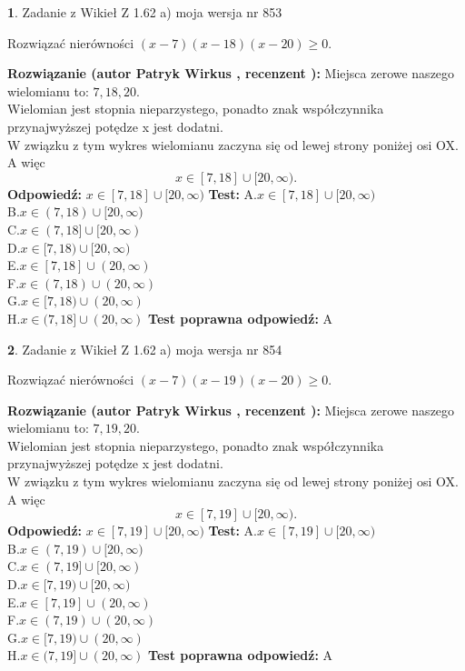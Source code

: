 \documentclass[12pt, a4paper]{article}
\theoremstyle{definition} %
\newtheorem{zad}{}
\newcommand{\zadStart}[1]{\begin{zad}#1\newline}
\newcommand{\zadStop}{\end{zad}}
\newcommand{\rozwStart}[2]{\noindent \textbf{Rozwiązanie (autor #1 , recenzent #2): }\newline}
\newcommand{\rozwStop}{\newline}
\newcommand{\odpStart}{\noindent \textbf{Odpowiedź:}\newline}
\newcommand{\odpStop}{\newline}
\newcommand{\testStart}{\noindent \textbf{Test:}\newline}
\newcommand{\testStop}{\newline}
\newcommand{\kluczStart}{\noindent \textbf{Test poprawna odpowiedź:}\newline}
\newcommand{\kluczStop}{\newline}
\begin{document}
\zadStart{Zadanie z Wikieł Z 1.62 a) moja wersja nr 853}

Rozwiązać nierówności $(x-7)(x-18)(x-20)\ge0$.
\zadStop
\rozwStart{Patryk Wirkus}{}
Miejsca zerowe naszego wielomianu to: $7, 18, 20$.\\
Wielomian jest stopnia nieparzystego, ponadto znak współczynnika przy\linebreak najwyższej potędze x jest dodatni.\\ W związku z tym wykres wielomianu zaczyna się od lewej strony poniżej osi OX. A więc $$x \in [7,18] \cup [20,\infty).$$
\rozwStop
\odpStart
$x \in [7,18] \cup [20,\infty)$
\odpStop
\testStart
A.$x \in [7,18] \cup [20,\infty)$\\
B.$x \in (7,18) \cup [20,\infty)$\\
C.$x \in (7,18] \cup [20,\infty)$\\
D.$x \in [7,18) \cup [20,\infty)$\\
E.$x \in [7,18] \cup (20,\infty)$\\
F.$x \in (7,18) \cup (20,\infty)$\\
G.$x \in [7,18) \cup (20,\infty)$\\
H.$x \in (7,18] \cup (20,\infty)$
\testStop
\kluczStart
A
\kluczStop



\zadStart{Zadanie z Wikieł Z 1.62 a) moja wersja nr 854}

Rozwiązać nierówności $(x-7)(x-19)(x-20)\ge0$.
\zadStop
\rozwStart{Patryk Wirkus}{}
Miejsca zerowe naszego wielomianu to: $7, 19, 20$.\\
Wielomian jest stopnia nieparzystego, ponadto znak współczynnika przy\linebreak najwyższej potędze x jest dodatni.\\ W związku z tym wykres wielomianu zaczyna się od lewej strony poniżej osi OX. A więc $$x \in [7,19] \cup [20,\infty).$$
\rozwStop
\odpStart
$x \in [7,19] \cup [20,\infty)$
\odpStop
\testStart
A.$x \in [7,19] \cup [20,\infty)$\\
B.$x \in (7,19) \cup [20,\infty)$\\
C.$x \in (7,19] \cup [20,\infty)$\\
D.$x \in [7,19) \cup [20,\infty)$\\
E.$x \in [7,19] \cup (20,\infty)$\\
F.$x \in (7,19) \cup (20,\infty)$\\
G.$x \in [7,19) \cup (20,\infty)$\\
H.$x \in (7,19] \cup (20,\infty)$
\testStop
\kluczStart
A
\kluczStop
\end{document}
